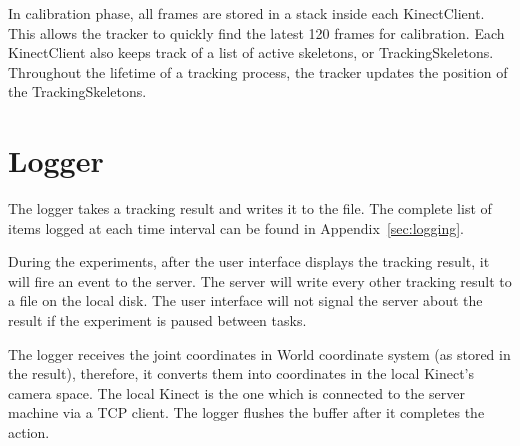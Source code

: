 In calibration phase, all frames are stored in a stack inside each KinectClient. This allows the tracker to quickly find the latest 120 frames for calibration. Each KinectClient also keeps track of a list of active skeletons, or TrackingSkeletons. Throughout the lifetime of a tracking process, the tracker updates the position of the TrackingSkeletons.

\section{Logger}
\label{sec:implementation_logger}

The logger takes a tracking result and writes it to the file. The complete list of items logged at each time interval can be found in Appendix~\ref{sec:logging}.

During the experiments, after the user interface displays the tracking result, it will fire an event to the server. The server will write every other tracking result to a file on the local disk. The user interface will not signal the server about the result if the experiment is paused between tasks.

The logger receives the joint coordinates in World coordinate system (as stored in the result), therefore, it converts them into coordinates in the local Kinect's camera space. The local Kinect is the one which is connected to the server machine via a TCP client. The logger flushes the buffer after it completes the action.


